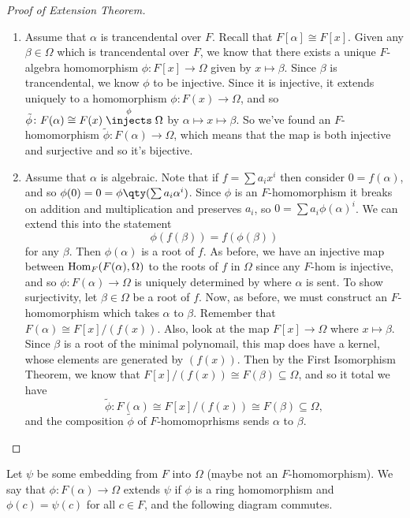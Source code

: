 \begin{proof}[Proof of Extension Theorem] \leavevmode
\begin{enumerate}[label={\textup{(\alph*)}}]
\item Assume that $\alpha$ is trancendental over $F$. Recall that $F[\alpha] \cong F[x]$. Given any $\beta \in \Omega$ which is trancendental over $F$, we know that there exists a unique $F$-algebra homomorphism $\phi \colon F[x] \to \Omega$ given by $x \mapsto \beta$. Since $\beta$ is trancendental, we know $\phi$ to be injective. Since it is injective, it extends uniquely to a homomorphism $\phi\colon F(x) \to \Omega$, and so $\tilde{\phi}\colon F(\alpha) \cong F(x) \stackrel{\phi}{\injects} \Omega$ by $\alpha \mapsto x\mapsto \beta$. So we've found an $F$-homomorphism $\tilde{\phi}\colon F(\alpha) \to \Omega$, which means that the map is both injective and surjective and so it's bijective. 
\item Assume that $\alpha$ is algebraic. Note that if $f = \sum a_ix^i$ then consider $0 = f(\alpha)$, and so $\phi(0) = 0 = \phi\qty(\sum a_i \alpha^i)$. Since $\phi$ is an $F$-homomorphism it breaks on addition and multiplication and preserves $a_i$, so $0 = \sum a_i \phi(\alpha)^i$. We can extend this into the statement 
\[ \phi(f(\beta)) = f(\phi(\beta)) \]
for any $\beta$. Then $\phi(\alpha)$ is a root of $f$. As before, we have an injective map between $\operatorname{Hom}_F(F(\alpha), \Omega)$ to the roots of $f$ in $\Omega$ since any $F$-hom is injective, and so $\phi\colon F(\alpha) \to \Omega$ is uniquely determined by where $\alpha$ is sent. To show surjectivity, let $\beta \in \Omega$ be a root of $f$. Now, as before, we must construct an $F$-homomorphism which takes $\alpha$ to $\beta$. Remember that $F(\alpha) \cong F[x]/(f(x))$. Also, look at the map $F[x] \to \Omega$ where $x \mapsto \beta$. Since $\beta$ is a root of the minimal polynomail, this map does have a kernel, whose elements are generated by $(f(x))$. Then by the First Isomorphism Theorem, we know that $F[x]/(f(x)) \cong F(\beta) \subseteq \Omega$, and so it total we have \[\tilde{\phi}\colon F(\alpha) \cong F[x]/(f(x)) \cong F(\beta) \subseteq \Omega,\]
and the composition $\tilde{\phi}$ of $F$-homomoprhisms sends $\alpha$ to $\beta$. \qedhere
\end{enumerate}
\end{proof}

\begin{theorem}
Let $\psi$ be some embedding from $F$ into $\Omega$ (maybe not an $F$-homomorphism). We say that $\phi\colon F(\alpha) \to \Omega$ extends $\psi$ if $\phi$ is a ring homomorphism and $\phi(c) = \psi(c)$ for all $c \in F$, and the following diagram commutes.
\begin{center}
\end{center}
\end{theorem}

